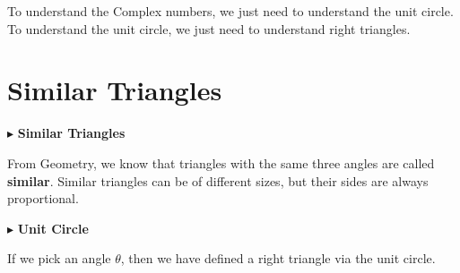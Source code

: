 \documentclass{ximera}
\begin{document}
To understand the Complex numbers, we just need to understand the unit circle.  To understand the unit circle, we just need to understand right triangles.














\section*{Similar Triangles}




$\blacktriangleright$ \textbf{\textcolor{blue!75!black}{Similar Triangles}}  

From Geometry, we know that triangles with the same three angles are called \textbf{similar}.  Similar triangles can be of different sizes, but their sides are always proportional.







$\blacktriangleright$ \textbf{\textcolor{blue!75!black}{Unit Circle}}  




If we pick an angle  $\theta$, then we have defined a right triangle via the unit circle.
\end{document}
